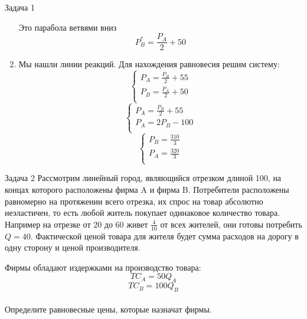\begin{mybox}{Задача 1}
\begin{enumerate}
        Это парабола ветвями вниз
        $$P_B^*=\frac{P_A}{2}+50$$
        \item Мы нашли линии реакций. Для нахождения равновесия решим систему:
        $$\begin{cases}
            P_A=\frac{P_B}{2}+55 \\
            P_B=\frac{P_A}{2}+50 \\
        \end{cases}$$
        $$\begin{cases}
            P_A=\frac{P_B}{2}+55 \\
            P_A=2P_B-100 \\
        \end{cases}$$
        $$\begin{cases}
            P_B=\frac{310}{3} \\
            P_A=\frac{320}{3} \\
        \end{cases}$$
    \end{enumerate}
\end{mybox}
\begin{mybox}{Задача 2}
    \indent\setlength{\parindent}{1em}\indent\setlength{\parindent}{1em}Рассмотрим линейный город, являющийся отрезком длиной 100, на концах которого расположены фирма A и фирма B.
    Потребители
    расположены равномерно на протяжении всего отрезка, их спрос на товар абсолютно неэластичен, то есть любой житель
    покупает одинаковое количество товара. Например на отрезке от 20 до 60 живет $\frac{4}{10}$ от всех жителей,
    они готовы потребить $Q=40$. Фактической ценой товара для жителя будет сумма расходов на дорогу в одну сторону и
    ценой производителя.
    \begin{center}
    \end{center}
    \indent\setlength{\parindent}{1em}\indent\setlength{\parindent}{1em}Фирмы обладают издержками на производство товара: $$TC_A=50Q_A$$ $$TC_B=100Q_B$$\\
    \indent\setlength{\parindent}{1em}Определите равновесные цены, которые назначат фирмы.
\end{mybox}
